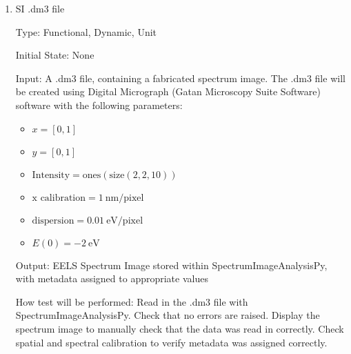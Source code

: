 \documentclass[12pt, titlepage]{article}
\newcommand{\progname}{SpectrumImageAnalysisPy}
\begin{document}
\begin{enumerate}
Output: Empty Spectrum Image stored within \progname{}; the first and second axes
should correspond to spatial dimensions, while the third axis should correspond
to a spectral dimension.

How test will be performed: Create a 3D data array and attempt to initialize a
spectrum image in \progname{}. No errors should be raised, but a warning should
be raised that the input data is empty. The spectrum image axes should be read
in the correct order (x, y, E), and the calibrations should be applied to the
correct axes.


\item{SI .dm3 file}

Type: Functional, Dynamic, Unit

Initial State: None

Input: A .dm3 file, containing a fabricated spectrum image. The .dm3 file will
be created using Digital Micrograph (Gatan Microscopy Suite Software) software
\cite{gatan_inc._gatan_nodate} with the following parameters:
\begin{itemize}
	\item $x = [0, 1]$
	\item $y = [0, 1]$
	\item $\text{Intensity} = \text{ones}(\text{size}(2,2,10))$
	\item $\text{x calibration} = 1\ \si{\nano\metre}/\text{pixel}$
	\item $\text{dispersion} = 0.01\ \si{\electronvolt}/\text{pixel}$
	\item $E(0) = -2\ \si{\electronvolt}$
\end{itemize}

Output: EELS Spectrum Image stored within \progname{}, with metadata assigned to
appropriate values

How test will be performed: Read in the .dm3 file with \progname{}. Check that
no errors are raised. Display the spectrum image to manually check that the data
was read in correctly. Check spatial and spectral calibration to verify metadata
was assigned correctly.




\end{enumerate}
\end{document}
